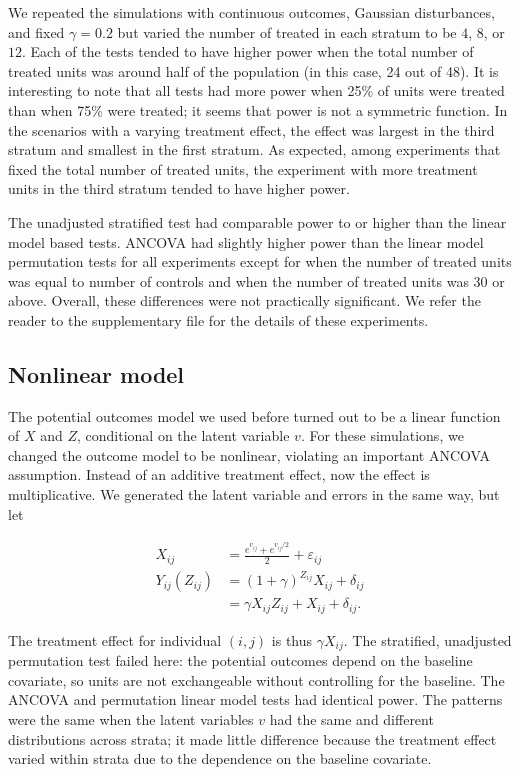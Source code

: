\documentclass[12pt]{article}
\begin{document}
We repeated the simulations with continuous outcomes, Gaussian disturbances, and fixed $\gamma=0.2$ but varied the number of treated in each stratum to be $4$, $8$, or $12$.
Each of the tests tended to have higher power when the total number of treated units was around half of the population (in this case, 24 out of 48).
It is interesting to note that all tests had more power when 25\% of units were treated than when 75\% were treated; it seems that power is not a symmetric function.
In the scenarios with a varying treatment effect, the  effect was largest in the third stratum and smallest in the first stratum.
As expected, among experiments that fixed the total number of treated units, the experiment with more treatment units in the third stratum tended to have higher power.

The unadjusted stratified test had comparable power to or higher than the linear model based tests.
ANCOVA had slightly higher power than the linear model permutation tests for all experiments except for when the number of treated units was equal to number of controls and when the number of treated units was 30 or above.
Overall, these differences were not practically significant.
We refer the reader to the supplementary file for the details of these experiments.



\subsection{Nonlinear model}

The potential outcomes model we used before turned out to be a linear function of $X$ and $Z$, conditional on the latent variable $v$.
For these simulations, we changed the outcome model to be nonlinear, violating an important ANCOVA assumption.
Instead of an additive treatment effect, now the effect is multiplicative.
We generated the latent variable and errors in the same way, but let 


\begin{align}
X_{ij} &=  \frac{ e^{v_{ij}} + e^{v_{ij}/2}}{2} +\varepsilon_{ij} \\
Y_{ij}(Z_{ij}) &= (1+\gamma)^{Z_{ij}} X_{ij}  + \delta_{ij} \nonumber \\
&= \gamma X_{ij}Z_{ij} + X_{ij} + \delta_{ij}.
\end{align}

The treatment effect for individual $(i, j)$ is thus $\gamma X_{ij}$.
The stratified, unadjusted permutation test failed here:
the potential outcomes depend on the baseline covariate, so units are not exchangeable without controlling for the baseline.
The ANCOVA and permutation linear model tests had identical power.
The patterns were the same when the latent variables $v$ had the same and different distributions across strata;
it made little difference because the treatment effect varied within strata due to the dependence on the baseline covariate.
\end{document}
